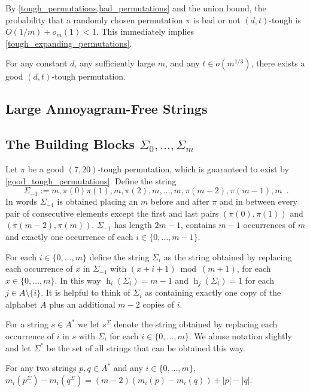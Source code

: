 \documentclass[kpfonts]{patmorin}
\DeclareMathOperator{\hist}{h}
\begin{document}
By \cref{tough_permutations,bad_permutations} and the union bound, the probability that a randomly chosen permutation $\pi$ is bad or not $(d,t)$-tough is $O(1/m)+o_m(1) < 1$.  This immediately implies \cref{tough_expanding_permutations}.
\begin{cor}\label{good_tough_permutations}
    For any constant $d$, any sufficiently large $m$, and any $t\in o(m^{1/3})$, there exists a good $(d,t)$-tough permutation.
\end{cor}

\subsection{Large Annoyagram-Free Strings}


\subsection{The Building Blocks $\Sigma_0,\ldots,\Sigma_m$}
Let $\pi$ be a good $(7,20)$-tough permutation, which is guaranteed to exist by \cref{good_tough_permutations}.
Define the string
\[
    \Sigma_{-1} := m,\pi(0)\pi(1),m,\pi(2),m,\ldots,m,\pi(m-2),\pi(m-1),m \enspace .
\]
In words $\Sigma_{-1}$ is obtained placing an $m$ before and after $\pi$ and in between every pair of consecutive elements except the first and last pairs $(\pi(0),\pi(1))$ and $(\pi(m-2),\pi(m))$.  $\Sigma_{-1}$ has length $2m-1$, contains $m-1$ occurrences of $m$ and exactly one occurrence of each $i\in\{0,\ldots,m-1\}$.

For each $i\in\{0,\ldots,m\}$ define the string $\Sigma_i$ as the string obtained by replacing each occurrence of $x$ in $\Sigma_{-1}$ with $(x+i+1)\bmod (m+1)$, for each $x\in\{0,\ldots,m\}$.  In this way $\hist_i(\Sigma_i) = m-1$ and $\hist_j(\Sigma_i)=1$ for each $j\in A\setminus\{i\}$. It is helpful to think of $\Sigma_i$ as containing exactly one copy of the alphabet $A$ plus an additional $m-2$ copies of $i$.


For a string $s\in A^*$ we let $s^\Sigma$ denote the string obtained by replacing each occurrence of $i$ in $s$ with $\Sigma_i$ for each $i\in\{0,\ldots,m\}$. We abuse notation slightly and let $\Sigma^*$ be the set of all strings that can be obtained this way.

\begin{lem}
    For any two strings $p,q\in A^*$ and any $i\in\{0,\ldots,m\}$, $m_i(p^\Sigma)-m_i(q^\Sigma) = (m-2)(m_i(p)-m_i(q)) + |p|-|q|$.
\end{lem}
\end{document}
